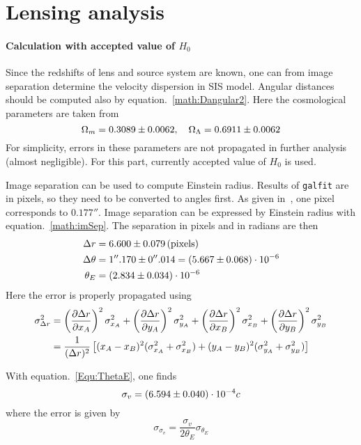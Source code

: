 \clearpage
\section{Lensing analysis} 
\paragraph{Calculation with accepted value of $H_0$}
Since the redshifts of lens and source system are known, one can from image separation determine the velocity dispersion in SIS model. Angular distances should be computed also by equation.~\ref{math:Dangular2}. Here the cosmological parameters are taken from~\cite{planck}
\begin{equation*}
	\Omega_m = \num{0.3089 +- 0.0062}, \quad \Omega_\Lambda=\num{0.6911 +- 0.0062}
\end{equation*}
For simplicity, errors in these parameters are not propagated in further analysis (almost negligible). For this part, currently accepted value of $H_0$ is used.

Image separation can be used to compute Einstein radius. Results of \verb|galfit| are in pixels, so they need to be converted to angles first. As given in~\cite{manual}, one pixel corresponds to $0.177''$. Image separation can be expressed by Einstein radius with equation.~\ref{math:imSep}. The separation in pixels and in radians are then
\begin{align*}
	\Delta r &= \num{6.60 +- 0.079} \, \text{(pixels)} \\
	\Delta \theta &= 1''.170 \pm 0''.014 =  (\num{5.667 +- 0.068}) \cdot 10^{-6}\\
	\theta_E &= (\num{2.834 +- 0.034}) \cdot 10^{-6}
\end{align*}
Here the error is properly propagated using
\begin{align*}
	\sigma_{\Delta r} ^2 &= \left( \pdv{\Delta r}{x_A}  \right)^2 \sigma_{x_A}^2 + \left( \pdv{\Delta r}{y_A}  \right)^2 \sigma_{y_A}^2 + \left( \pdv{\Delta r}{x_B}  \right)^2 \sigma_{x_B}^2 + \left( \pdv{\Delta r}{y_B}  \right)^2 \sigma_{y_B}^2 \\
								&= \frac{1}{(\Delta r)^2} \left[ (x_A - x_B)^2(\sigma_{x_A}^2 + \sigma_{x_B}^2) + (y_A - y_B)^2 (\sigma_{y_A}^2 + \sigma_{y_B}^2) \right]
\end{align*}

With equation.~\ref{Equ:ThetaE}, one finds
\begin{equation}
	\sigma_v = (\num{6.594 +- 0.040 })\cdot 10^{-4} c
\end{equation}
where the error is given by
\begin{equation*}
	\sigma_{\sigma_v} = \frac{\sigma_v}{2\theta_E} \sigma_{\theta_E}
\end{equation*}

